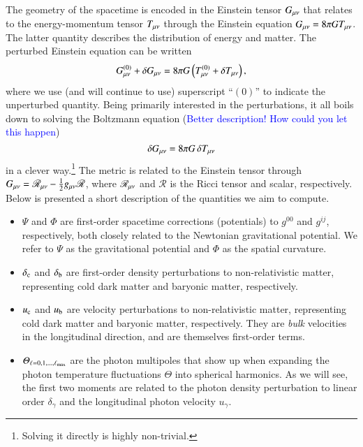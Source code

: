 


The geometry of the spacetime is encoded in the Einstein tensor $G_{\mu \nu}$ that relates to the energy-momentum tensor $T_{\mu \nu}$ through the Einstein equation $G_{\mu \nu} = 8\pi G T_{\mu \nu}$. The latter quantity describes the distribution of energy and matter. The perturbed Einstein equation can be written
\begin{equation}
    G^{(0)}_{\mu \nu} +\delta G_{\mu \nu} = 8\pi G \left( T^{(0)}_{\mu \nu}+\delta T_{\mu \nu} \right),
\end{equation}
where we use (and will continue to use) superscript ``$(0)$'' to indicate the unperturbed quantity. Being primarily interested in the perturbations, it all boils down to solving the Boltzmann equation (\textcolor{blue}{Better description! How could you let this happen})
\begin{equation}\label{mil3:theo:eq:delta_G}
    \delta G_{\mu \nu} = 8\pi G\, \delta T_{\mu \nu}
\end{equation}
in a clever way.\footnote{Solving it directly is highly non-trivial.} The metric is related to the Einstein tensor through $G_{\mu \nu}= \mathscr{R}_{\mu \nu} - \frac{1}{2}g_{\mu \nu} \mathscr{R}$, where $\mathscr{R}_{\mu \nu}$ and $\mathscr{R}$ is the Ricci tensor and scalar, respectively. 
Below is presented a short description of the quantities we aim to compute. 
\begin{itemize}
    \item $\Psi$ and $\Phi$ are first-order spacetime corrections (potentials) to $g^{00}$ and $g^{ij}$, respectively, both closely related to the Newtonian gravitational potential. We refer to $\Psi$ as the gravitational potential and $\Phi$ as the spatial curvature.
    \item $\delta_\mathrm{c}$ and $\delta_\mathrm{b}$ are first-order density perturbations to non-relativistic matter, representing cold dark matter and baryonic matter, respectively.
    \item $u_\mathrm{c}$ and $u_\mathrm{b}$ are velocity perturbations to non-relativistic matter, representing cold dark matter and baryonic matter, respectively. They are \textit{bulk} velocities in the longitudinal direction, and are themselves first-order terms.
    \item $\varTheta_{\ell= 0, 1, \dots, \ell_\mathrm{max}}$ are the photon multipoles that show up when expanding the photon temperature fluctuations $\Theta$ into spherical harmonics. As we will see, the first two moments are related to the photon density perturbation to linear order $\delta_\gamma$ and the longitudinal photon velocity $u_\gamma$.
\end{itemize}

